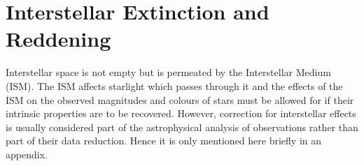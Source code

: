 \documentclass[twoside,11pt]{article}
\newcommand{\xlabel}[1]{}
\begin{document}
\newpage
\appendix
{}

\section{\xlabel{INTERSTELLAR}\label{INTERSTELLAR}Interstellar Extinction
and Reddening}

Interstellar space is not empty but is permeated by the Interstellar
Medium (ISM).  The ISM affects starlight which passes through it and
the effects of the ISM on the observed magnitudes and colours of stars
must be allowed for if their intrinsic properties are to be recovered.
However, correction for interstellar effects is usually considered part of
the astrophysical analysis of observations rather than part of their data
reduction.  Hence it is only mentioned here briefly in an appendix.
\end{document}

